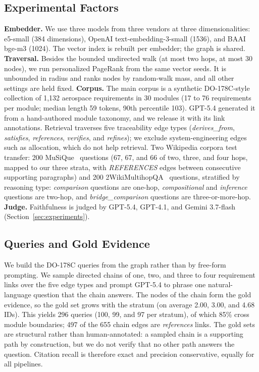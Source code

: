 \subsection{Experimental Factors}
\label{sec:axes}
\textbf{Embedder.} We use three models from three vendors at three
dimensionalities: e5-small (384 dimensions), OpenAI
text-embedding-3-small (1536), and BAAI bge-m3 (1024). The vector index is rebuilt per embedder; the graph is shared.
\textbf{Traversal.} Besides the bounded undirected walk (at most two
hops, at most 30 nodes), we run personalized PageRank from the same
vector seeds. It is unbounded in radius and ranks nodes by random-walk
mass, and all other settings are held fixed.
\textbf{Corpus.} The main corpus is a synthetic DO-178C-style
collection of 1{,}132 aerospace requirements in 30 modules (17 to 76
requirements per module; median length 59 tokens, 90th percentile 103).
GPT-5.4 generated it from a hand-authored module taxonomy, and we
release it with its link annotations. Retrieval traverses five
traceability edge types (\textit{derives\_from}, \textit{satisfies},
\textit{references}, \textit{verifies}, and \textit{refines}); we exclude
system-engineering edges such as allocation, which do not help
retrieval. Two Wikipedia corpora test transfer: 200 MuSiQue~\cite{musique2022}
questions (67, 67, and 66 of two, three, and four hops, mapped to our
three strata, with \textit{REFERENCES} edges between consecutive
supporting paragraphs) and 200 2WikiMultihopQA~\cite{twowiki2020}
questions, stratified by reasoning type: \textit{comparison} questions are one-hop,
\textit{compositional} and \textit{inference} questions are two-hop, and
\textit{bridge\_comparison} questions are three-or-more-hop.
\textbf{Judge.} Faithfulness is judged by GPT-5.4, GPT-4.1, and
Gemini 3.7-flash (Section~\ref{sec:experiments}).

\subsection{Queries and Gold Evidence}
\label{sec:queries}
We build the DO-178C queries from the graph rather than by free-form
prompting. We sample directed chains of one, two, and three to four
requirement links over the five edge types and prompt GPT-5.4 to phrase
one natural-language question that the chain answers. The nodes of the
chain form the gold evidence, so the gold set grows with the stratum
(on average 2.00, 3.00, and 4.68 IDs). This yields 296 queries (100,
99, and 97 per stratum), of which 85\% cross module boundaries; 497 of
the 655 chain edges are \textit{references} links. The gold sets are structural rather than human-annotated: a sampled
chain is a supporting path by construction, but we do not verify that
no other path answers the question. Citation recall is therefore exact
and precision conservative, equally for all pipelines.

